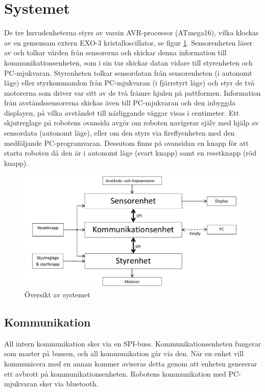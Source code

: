 %

\section{Systemet}

De tre huvudenheterna styrs av varsin AVR-processor (ATmega16), vilka klockas 
av en gemensam extern EXO-3 kristalloscillator, se figur \ref{fig:system}. Sensorenheten läser av och 
tolkar värden från sensorerna och skickar denna information till 
kommunikationsenheten, som i sin tur skickar datan vidare till styrenheten 
och PC-mjukvaran. Styrenheten tolkar sensordatan från 
sensorenheten (i autonomt läge) eller styrkommandon från PC-mjukvaran 
(i fjärrstyrt läge) och styr de två motorerna som driver var sitt av de två 
främre hjulen på pattformen. Information från avståndssensorerna skickas även
till PC-mjukvaran och den inbyggda displayen, på vilka avståndet till 
närliggande väggar visas i centimeter.  Ett skjutreglage på robotens ovansida 
avgör om roboten navigerar själv med hjälp av sensordata (autonomt läge), 
eller om den styrs via fireflyenheten med den medföljande PC-programvaran. 
Dessutom finns på ovansidan en knapp för att starta roboten då den är i autonomt läge 
(svart knapp) samt en resetknapp (röd knapp).

\begin{figure}[H]
 \centering
 \includegraphics[angle=0,scale=0.8]{bilder/systemoversikt.pdf}
  \caption{Översikt av systemet}
  \label{fig:system}
\end{figure}


\subsection{Kommunikation}
All intern kommunikation sker via en SPI-buss. Kommunikationsenheten fungerar 
som master på bussen, och all kommunikation går via den. När en enhet vill 
kommunicera med en annan kommer aviseras detta genom att enheten genererar 
ett avbrott på kommunikationsenheten.  Robotens kommunikation med PC-
mjukvaran sker via bluetooth.
